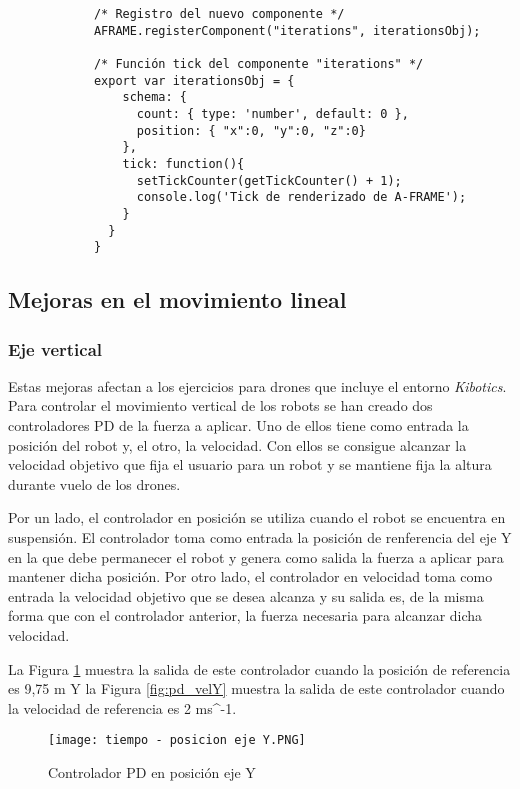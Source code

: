 \small {
\begin{verbatim}
            /* Registro del nuevo componente */
            AFRAME.registerComponent("iterations", iterationsObj);
            
            /* Función tick del componente "iterations" */
            export var iterationsObj = {
                schema: {
                  count: { type: 'number', default: 0 },
                  position: { "x":0, "y":0, "z":0}
                },
                tick: function(){
                  setTickCounter(getTickCounter() + 1);
                  console.log('Tick de renderizado de A-FRAME');
                }
              }
            }
\end{verbatim}
}

\subsection{Mejoras en el movimiento lineal}
\subsubsection{Eje vertical}
\normalsize
Estas mejoras afectan a los ejercicios para drones que incluye el entorno \textit{Kibotics}. Para controlar el movimiento vertical de los robots se han creado dos controladores PD de la fuerza a aplicar. Uno de ellos tiene como entrada la posición del robot y, el otro, la velocidad. Con ellos se consigue alcanzar la velocidad objetivo que fija el usuario para un robot y se mantiene fija la altura durante vuelo de los drones. \newline

Por un lado, el controlador en posición se utiliza cuando el robot se encuentra en suspensión. El controlador toma como entrada la posición de renferencia del eje Y en la que debe permanecer el robot y genera como salida la fuerza a aplicar para mantener dicha posición. Por otro lado, el controlador en velocidad toma como entrada la velocidad objetivo que se desea alcanza y su salida es, de la misma forma que con el controlador anterior, la fuerza necesaria para alcanzar dicha velocidad. \newline 

La Figura \ref{fig:pd_pos} muestra la salida de este controlador cuando la posición de referencia es 9,75 m Y la Figura \ref{fig:pd_velY} muestra la salida de este controlador cuando la velocidad de referencia es 2 ms^{-1}.

\begin{figure}[h!]
    \centering
    \texttt{[image: tiempo - posicion eje Y.PNG]}
    \caption{Controlador PD en posición eje Y}
    \label{fig:pd_pos}
\end{figure}

